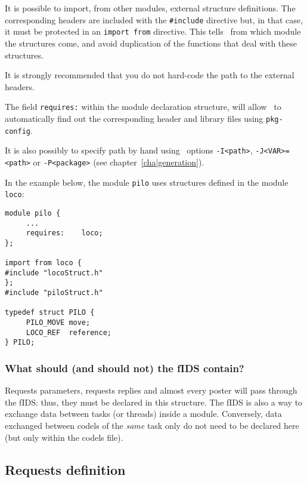 It is  possible to   import,  from  other  modules, external    structure
definitions. The corresponding headers are included with the 
\texttt{\#include} directive but, in that case, it must be protected in an 
\texttt{import from}    directive.  This tells \GenoM\     from which module  the
structures come, and  avoid duplication of  the functions that deal  with
these structures.

It is strongly recommended that you do not hard-code the path to the
external headers. 

The field \texttt{requires:} within the module declaration structure, will
allow \GenoM\ to automatically find out the corresponding header and
library files using \texttt{pkg-config}.

It is also possibly to specify path by hand using \GenoM\ options 
\texttt{-I<path>}, \texttt{-J<VAR>=<path>} or \texttt{-P<package>} (see
chapter~\vref{cha|generation}).

In the example  below, the module  \texttt{pilo} uses  structures defined in
the module \texttt{loco}:

\begin{center}\begin{cartouche}\small\begin{verbatim}
module pilo {
     ...
     requires:    loco;
};

import from loco {
#include "locoStruct.h"
};
#include "piloStruct.h"

typedef struct PILO {
     PILO_MOVE move;
     LOCO_REF  reference;
} PILO;
\end{verbatim}\end{cartouche}\end{center}

\subsubsection{What should (and should not) the fIDS contain?}

Requests parameters, requests replies  and almost every poster  will pass
through the fIDS: thus, they must be declared in this structure. The fIDS
is also a way to   exchange data between tasks    (or threads) inside   a
module. Conversely, data exchanged between codels of  the \emph{same} task
only do not need to be declared here (but only within the codels file).


\subsection{Requests definition}

